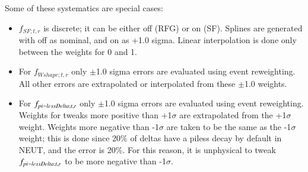 Some of these systematics are special cases:
\begin{itemize}
\item 
  $f_{SF; t, r}$ is discrete; it can be either off (RFG) or on (SF). 
  Splines are generated with off as nominal, and on as +1.0 sigma.
  Linear interpolation is done only between the weights for 0 and 1.
\item 
  For $f_{Wshape; t, r}$ only $\pm$1.0 sigma errors are evaluated using event reweighting. 
  All other errors are extrapolated or interpolated from these $\pm$1.0 weights.
\item 
  For $f_{\\pi-less\\Delta; t, r}$ only $\pm$1.0 sigma errors are evaluated using event reweighting.
  Weights for tweaks more positive than +1$\sigma$ are extrapolated from the +1$\sigma$ weight. Weights more negative than 
  -1$\sigma$ are taken to be the same as the -1$\sigma$ weight; this is done since 20\% of deltas have a piless decay by 
  default in NEUT, and the error is 20\%. For this reason, it is unphysical to tweak $f_{\\pi-less\\Delta; t, r}$ to be 
  more negative than -1$\sigma$. 
\end{itemize}

